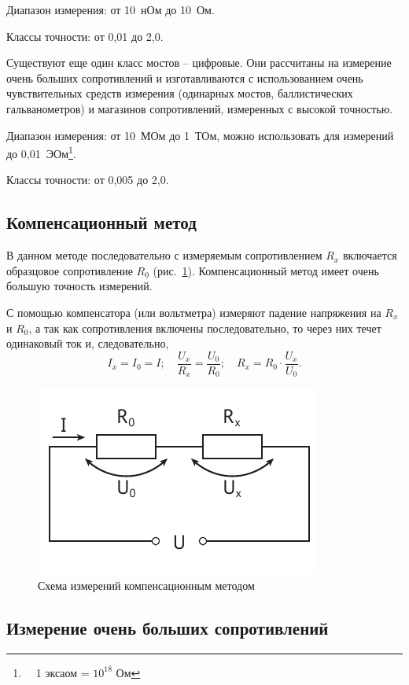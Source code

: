 \documentclass[pscyr,titlepage]{hedreport}
\newcommand{\Pic}[1]{\ref{pic#1}}
\newcommand{\pic}[1]{рис.~\Pic{#1}}
\begin{document}
  Диапазон измерения: от 10~нОм до 10~Ом.
  
  Классы точности: от 0,01 до 2,0.
  
  \bigskip
  
  Существуют еще один класс мостов -- цифровые. Они рассчитаны на измерение
  очень больших сопротивлений и изготавливаются с использованием очень
  чувствительных средств измерения (одинарных мостов, баллистических
  гальванометров) и магазинов сопротивлений, измеренных с высокой точностью.
  
  Диапазон измерения: от 10~МОм до 1~ТОм, можно использовать для измерений до
    0,01~ЭОм\footnote{\ \ 1 эксаом = \( 10^{18} \) Ом}.
  
  Классы точности: от 0,005 до 2,0.
  
  \subsection{Компенсационный метод}
  
  В данном методе последовательно с измеряемым сопротивлением \( R_x \)
  включается образцовое сопротивление \( R_0 \) (\pic{comp}). Компенсационный
  метод имеет очень большую точность измерений.
  
  С помощью компенсатора (или вольтметра) измеряют падение напряжения на
  \( R_x \) и \( R_0 \), а так как сопротивления включены последовательно, то
  через них течет одинаковый ток и, следовательно,
  \[
    I_x = I_0 = I; \quad \frac{U_x}{R_x} = \frac{U_0}{R_0}; \quad
      R_x = R_0 \cdot \frac{U_x}{U_0}.
  \]
  
  \begin{figure}[!t]
    \center
    \includegraphics[width=.5\textwidth]{comp}
    \caption{Схема измерений компенсационным методом}
    \label{piccomp}
  \end{figure}

  \subsection{Измерение очень больших сопротивлений}
  
\end{document}
